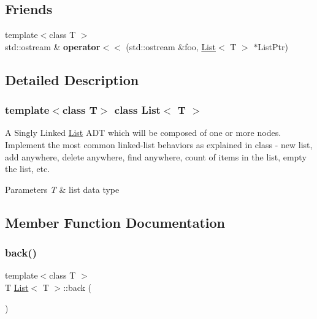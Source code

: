 \subsection*{Friends}
\begin{DoxyCompactItemize}
\item 
\mbox{\label{class_list_a79a617fcbf0937a4ef1f1df45558dcc4}} 
{\footnotesize template$<$class T $>$ }\\std\+::ostream \& {\bfseries operator$<$$<$} (std\+::ostream \&foo, \hyperlink{class_list}{List}$<$ T $>$ $\ast$List\+Ptr)
\end{DoxyCompactItemize}


\subsection{Detailed Description}
\subsubsection*{template$<$class T$>$\newline
class List$<$ T $>$}

A Singly Linked \hyperlink{class_list}{List} A\+DT which will be composed of one or more nodes. Implement the most common linked-\/list behaviors as explained in class -\/ new list, add anywhere, delete anywhere, find anywhere, count of items in the list, empty the list, etc. 
\begin{DoxyParams}{Parameters}
{\em T} & list data type \\
\hline
\end{DoxyParams}


\subsection{Member Function Documentation}
\mbox{\label{class_list_adcdd54cf42f6a98990618901e1fafa59}} 
\subsubsection{\texorpdfstring{back()}{back()}}
{\footnotesize\ttfamily template$<$class T $>$ \\
T \hyperlink{class_list}{List}$<$ T $>$\+::back (\begin{DoxyParamCaption}{ }\end{DoxyParamCaption})}

